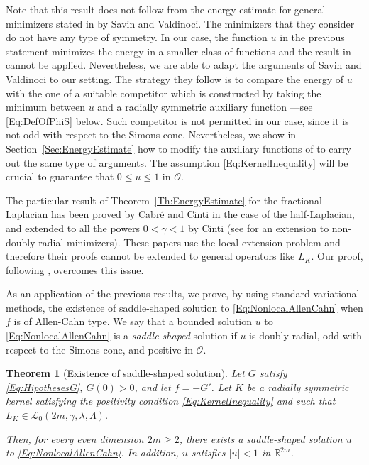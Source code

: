 \documentclass[12pt,reqno]{amsart}
\newtheorem{theorem}{Theorem}[section]
\theoremstyle{definition}
\theoremstyle{remark}
\newcommand{\con}[1]{\mathbb{#1}}
\newcommand{\R}{\con{R}} %
\newcommand{\lcal}{\mathcal{L}}
\newcommand{\ocal}{\mathcal{O}}
\newcommand{\s}{\gamma}
\numberwithin{equation}{section}
\begin{document}
Note that this result does not follow from the energy estimate for general minimizers stated in \cite{SavinValdinoci-EnergyEstimate} by Savin and Valdinoci. The minimizers that they consider do not have any type of symmetry. In our case, the function $u$ in the previous statement minimizes the energy in a smaller class of functions and the result in \cite{SavinValdinoci-EnergyEstimate} cannot be applied. Nevertheless, we are able to adapt the arguments of Savin and Valdinoci to our setting.  The strategy they follow is to compare the energy of $u$ with the one of a suitable competitor which is constructed by taking the minimum between $u$ and a radially symmetric auxiliary function ---see \eqref{Eq:DefOfPhiS} below. Such competitor is not permitted in our case, since it is not odd with respect to the Simons cone. Nevertheless, we show in Section~\ref{Sec:EnergyEstimate} how to modify the auxiliary functions of \cite{SavinValdinoci-EnergyEstimate} to carry out the same type of arguments. The assumption \eqref{Eq:KernelInequality} will be crucial to guarantee that $0\leq u \leq 1$ in $\ocal$.

The particular result of Theorem~\ref{Th:EnergyEstimate} for the fractional Laplacian has been proved by Cabré and Cinti \cite{CabreCinti-EnergyHalfL} in the case of the half-Laplacian, and extended to all the powers $0<\s<1$ by Cinti \cite{Cinti-Saddle2} (see \cite{CabreCinti-SharpEnergy} for an extension to non-doubly radial minimizers). These papers use the local extension problem and therefore their proofs cannot be extended to general operators like $L_K$. Our proof, following \cite{SavinValdinoci-EnergyEstimate}, overcomes this issue.


As an application of the previous results, we prove, by using standard variational methods, the existence of saddle-shaped solution to \eqref{Eq:NonlocalAllenCahn} when $f$ is of Allen-Cahn type. We say that a bounded solution $u$ to \eqref{Eq:NonlocalAllenCahn} is a \emph{saddle-shaped} solution if $u$ is doubly radial, odd with respect to the Simons cone, and positive in $\ocal$. 

\begin{theorem}[Existence of saddle-shaped solution]
	\label{Th:Existence}
	Let $G$ satisfy \eqref{Eq:HipothesesG}, $G(0)>0$, and let $f=-G'$. Let $K$ be a radially symmetric kernel satisfying the positivity condition \eqref{Eq:KernelInequality} and such that $L_K\in \lcal_0(2m, \s, \lambda, \Lambda)$. 
	
	Then, for every even dimension $2m \geq 2$, there exists a saddle-shaped solution $u$ to \eqref{Eq:NonlocalAllenCahn}. In addition, $u$ satisfies $|u|<1$ in $\R^{2m}$.
\end{theorem}
\end{document}
